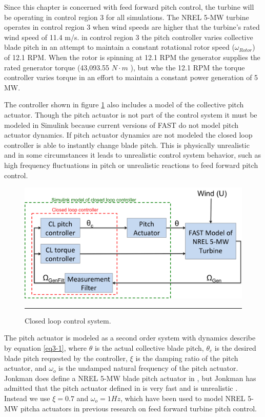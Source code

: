 Since this chapter is concerned with feed forward pitch control, the turbine will be operating in control region 3 for all simulations. The NREL 5-MW turbine operates in control region 3 when wind speeds are higher that the turbine's rated wind speed of 11.4 m/s. in control region 3 the pitch controller varies collective blade pitch in an attempt to maintain a constant rotational rotor speed ($\omega_{Rotor}$) of 12.1 RPM. When the rotor is spinning at 12.1 RPM the generator supplies the rated generator torque (43,093.55 $N \cdot m$ ), but whe the 12.1 RPM the torque controller varies torque in an effort to maintain a constant power generation of 5 MW. 

The controller shown in figure \ref{fig3-9} also includes a model of the collective pitch actuator. Though the pitch actuator is not part of the control system it must be modeled in Simulink because current versions of FAST do not model pitch actuator dynamics. If pitch actuator dynamics are not modeled the closed loop controller is able to instantly change blade pitch. This is physically unrealistic and in some circumstances it leads to unrealistic control system behavior, such as high frequency fluctuations in pitch or unrealistic reactions to feed forward pitch control.

 \begin{figure}[htbp]
	\centering
		\includegraphics[width=\linewidth]{Figures/ch3Figures/fig3-9.png}
		\rule{35em}{0.5pt}
	\caption{Closed loop control system.}
	\label{fig3-9}
\end{figure}

The pitch actuator is modeled as a second order system with dynamics describe by equation \ref{eq3-1}, where  $\theta$  is the actual collective blade pitch, $\theta_c$ is the desired blade pitch requested by the controller, $\xi$ is the damping ratio of the pitch actuator, and $\omega_o$ is the undamped natural frequency of the pitch actuator. Jonkman does define a NREL 5-MW blade pitch actuator in \cite{jonkman2009}, but Jonkman has admitted that the pitch actuator defined in \cite{jonkman2009} is very fast and is unrealistic \cite{jonkman2014}. Instead we use $\xi = 0.7$ and $\omega_o = 1Hz$, which have been used to model NREL 5-MW pitcha actuators in previous research on feed forward turbine pitch control\cite{dunne2011,dunne2012}. 

